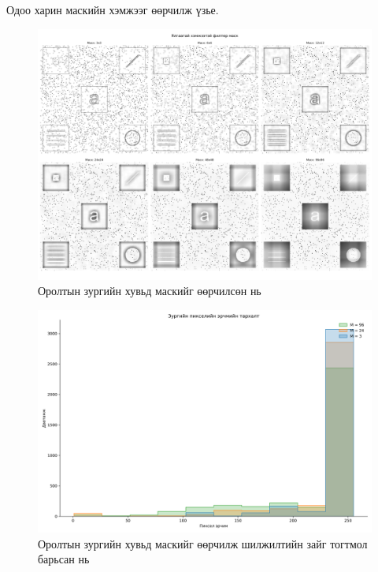 \documentclass[a4paper]{article}
\begin{document}
Одоо харин маскийн хэмжээг өөрчилж үзье.
\begin{figure}[H]
  \centering
  \includegraphics[scale = 0.30]{mask_different_strides_1.png}
  \caption[Intensity 1]{Оролтын зургийн хувьд маскийг өөрчилсөн нь}
\end{figure}
\begin{figure}[H]
  \centering
  \includegraphics[scale = 0.30]{img_same_strides_diff_mask_hist.png}
  \caption[Intensity 1]{Оролтын зургийн хувьд маскийг өөрчилж шилжилтийн зайг тогтмол барьсан нь}
\end{figure}
\end{document}
